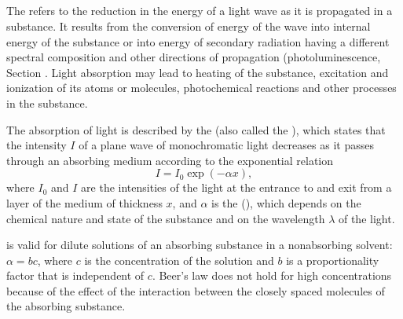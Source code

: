 \subsection{}\label{34.2.1} The  refers to the reduction in the energy of a light wave as it is propagated in a substance. It results from the conversion of energy of the wave into internal energy  of the substance or into energy of secondary radiation having a different spectral composition and other directions of propagation (photoluminescence, Section . Light
absorption may lead to heating of the substance, excitation and ionization of its atoms or molecules, photochemical reactions and other processes in the substance.

The absorption of light is described by the  (also called the ), which states that the intensity $I$ of a plane wave of monochromatic light decreases as it passes through an absorbing medium according to the exponential relation
\begin{equation*}%
I = I_{0} \exp (-\alpha x),
\end{equation*}
where $I_{0}$ and $I$ are the intensities of the light at the entrance to and exit from a layer of the medium of thickness $x$, and $\alpha$ is the  (), which depends on the chemical nature and state of the substance and on the wavelength $\lambda$ of the light.

 is valid for dilute solutions of an absorbing substance in a nonabsorbing solvent: $\alpha = bc$, where $c$ is the concentration of the solution and $b$ is a proportionality factor that is independent of $c$. Beer's law does not hold for high concentrations because of the effect of the interaction between the closely spaced molecules of the absorbing substance.

